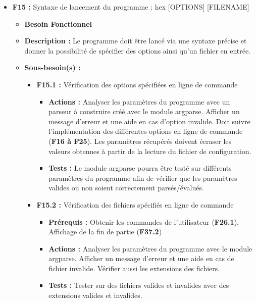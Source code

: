 \documentclass{article}
\begin{document}
\begin{itemize}
\begin{itemize}
        \item \textbf{Tests :} Vérifier que la fonction info marche sans mode et avec les modes verbose et debug.
    \end{itemize}
\bigskip
    \item \textbf{F15 :} Syntaxe de lancement du programme : hex [OPTIONS] [FILENAME]
    \begin{itemize}
        \item \textbf{Besoin Fonctionnel}
        \item \textbf{Description :} Le programme doit être lancé via une syntaxe précise et donner la possibilité de spécifier des options ainsi qu'un fichier en entrée.
        \item \textbf{Sous-besoin(s) :}
        \begin{itemize}
            \smallskip
            \item \textbf{F15.1 :} Vérification des options spécifiées en ligne de commande
            \begin{itemize}
                \item \textbf{Actions :} Analyser les paramètres du programme avec un parseur à construire créé avec le module argparse. Afficher un message d’erreur et une aide en cas d’option invalide. Doit suivre l’implémentation des différentes options en ligne de commande (\textbf{F16 à F25}). Les paramètres récupérés doivent écraser les valeurs obtenues à partir de la lecture du fichier de configuration.
                \item \textbf{Tests :} Le module argparse pourra être testé sur différents paramètres du programme afin de vérifier que les paramètres valides ou non soient correctement parsés/évalués.
            \end{itemize}
            \smallskip
            \item \textbf{F15.2 :} Vérification des fichiers spécifiés en ligne de commande
            \begin{itemize}
                \item \textbf{Prérequis :} Obtenir les commandes de l’utilisateur (\textbf{F26.1}), Affichage de la fin de partie (\textbf{F37.2})
                \item \textbf{Actions :} Analyser les paramètres du programme avec le module argparse. Afficher un message d’erreur et une aide en cas de fichier invalide. Vérifier aussi les extensions des fichiers.
                \item \textbf{Tests :} Tester sur des fichiers valides et invalides avec des extensions valides et invalides.

\end{itemize}
\end{itemize}
\end{itemize}
\end{itemize}
\end{document}
